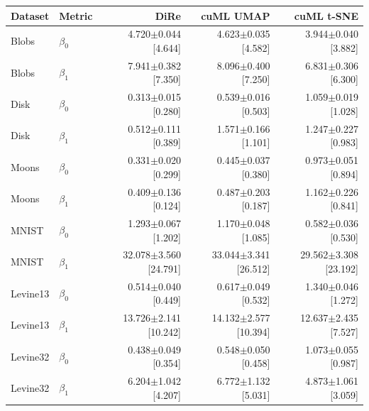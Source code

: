\begin{tabular}{@{}llrrr@{}}
\toprule
Dataset & Metric & DiRe & cuML UMAP & cuML t-SNE \\
\midrule
Blobs & $\beta_0$ & 4.720$\pm$0.044 [4.644] & 4.623$\pm$0.035 [4.582] & 3.944$\pm$0.040 [3.882] \\
Blobs & $\beta_1$ & 7.941$\pm$0.382 [7.350] & 8.096$\pm$0.400 [7.250] & 6.831$\pm$0.306 [6.300] \\
\addlinespace
Disk & $\beta_0$ & 0.313$\pm$0.015 [0.280] & 0.539$\pm$0.016 [0.503] & 1.059$\pm$0.019 [1.028] \\
Disk & $\beta_1$ & 0.512$\pm$0.111 [0.389] & 1.571$\pm$0.166 [1.101] & 1.247$\pm$0.227 [0.983] \\
\addlinespace
Moons & $\beta_0$ & 0.331$\pm$0.020 [0.299] & 0.445$\pm$0.037 [0.380] & 0.973$\pm$0.051 [0.894] \\
Moons & $\beta_1$ & 0.409$\pm$0.136 [0.124] & 0.487$\pm$0.203 [0.187] & 1.162$\pm$0.226 [0.841] \\
\addlinespace
MNIST & $\beta_0$ & 1.293$\pm$0.067 [1.202] & 1.170$\pm$0.048 [1.085] & 0.582$\pm$0.036 [0.530] \\
MNIST & $\beta_1$ & 32.078$\pm$3.560 [24.791] & 33.044$\pm$3.341 [26.512] & 29.562$\pm$3.308 [23.192] \\
\addlinespace
Levine13 & $\beta_0$ & 0.514$\pm$0.040 [0.449] & 0.617$\pm$0.049 [0.532] & 1.340$\pm$0.046 [1.272] \\
Levine13 & $\beta_1$ & 13.726$\pm$2.141 [10.242] & 14.132$\pm$2.577 [10.394] & 12.637$\pm$2.435 [7.527] \\
\addlinespace
Levine32 & $\beta_0$ & 0.438$\pm$0.049 [0.354] & 0.548$\pm$0.050 [0.458] & 1.073$\pm$0.055 [0.987] \\
Levine32 & $\beta_1$ & 6.204$\pm$1.042 [4.207] & 6.772$\pm$1.132 [5.031] & 4.873$\pm$1.061 [3.059] \\
\bottomrule
\end{tabular}
